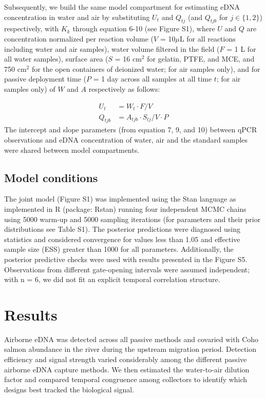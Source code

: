\documentclass{article}
\begin{document}
Subsequently, we build the same model compartment for estimating eDNA concentration in water and air by substituting $U_t$ and $Q_{tj}$ (and $Q_{tjb}$ for $j \in \{1,2\}$) respectively, with $K_k$ through equation 6-10 (see Figure S1), where $U$ and $Q$ are concentration normalized per reaction volume ($V$ = 10$\mu$L for all reactions including water and air samples), water volume filtered in the field ($F$ = 1 L for all water samples), surface area ($S$ = 16 cm$^2$ for gelatin, PTFE, and MCE, and 750 cm$^2$ for the open containers of deionized water; for air samples only), and for passive deployment time ($P$ = 1 day across all samples at all time $t$; for air samples only) of $W$ and $A$ respectively as follows:

\begin{align}
    U_t & = W_t \cdot F / V\\
    Q_{tjb} & = A_{tjb} \cdot S_{tj} / V \cdot P
\end{align}
The intercept and slope parameters (from equation 7, 9, and 10) between qPCR observations and eDNA concentration of water, air and the standard samples were shared between model compartments.

\subsection{Model conditions}

The joint model (Figure S1) was implemented using the Stan language as implemented in R (package: Rstan) running four independent MCMC chains using 5000 warm-up and 5000 sampling iterations (for parameters and their prior distributions see Table S1). The posterior predictions were diagnosed using statistics \cite{gelman1992} and considered convergence for values less than 1.05 and effective sample size (ESS) greater than 1000 for all parameters. Additionally, the posterior predictive checks were used with results presented in the Figure S5. Observations from different gate-opening intervals were assumed independent; with n = 6, we did not fit an explicit temporal correlation structure.

\section{Results}

Airborne eDNA was detected across all passive methods and covaried with Coho salmon abundance in the river during the upstream migration period. Detection efficiency and signal strength varied considerably among the different passive airborne eDNA capture methods. We then estimated the water-to-air dilution factor and compared temporal congruence among collectors to identify which designs best tracked the biological signal.
\end{document}
